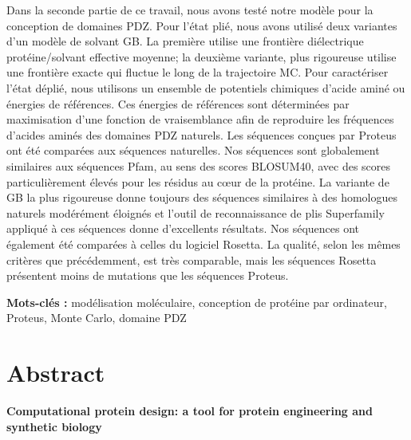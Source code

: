  Dans la seconde partie de ce travail, nous avons testé notre modèle pour la conception de domaines PDZ. Pour l'état plié, nous avons utilisé deux variantes d'un modèle de solvant GB. La première utilise une frontière diélectrique protéine/solvant effective moyenne; la deuxième variante, plus rigoureuse utilise une frontière exacte qui fluctue le long de la trajectoire MC. Pour caractériser l’état déplié, nous utilisons un ensemble de potentiels chimiques d’acide aminé ou énergies de références. Ces énergies de références sont déterminées par maximisation d'une fonction de vraisemblance afin de reproduire les fréquences d'acides aminés des domaines PDZ naturels. Les séquences conçues par Proteus ont été comparées aux séquences naturelles. Nos séquences sont globalement similaires aux séquences Pfam, au sens des scores BLOSUM40, avec des scores particulièrement élevés pour les résidus au cœur de la protéine. La variante de GB la plus rigoureuse donne toujours des séquences similaires à des homologues naturels modérément éloignés et l’outil de reconnaissance de plis Superfamily appliqué à ces séquences donne d’excellents résultats. Nos séquences ont également été comparées à celles du logiciel Rosetta. La qualité, selon les mêmes critères que précédemment, est très comparable, mais les séquences Rosetta présentent moins de mutations que les séquences Proteus.   

\bigskip

\textbf{Mots-clés :} modélisation moléculaire, conception de protéine par ordinateur, Proteus, Monte Carlo, domaine PDZ

\vfill




\section*{Abstract}

{\large\bf\noindent Computational protein design: a tool for protein engineering and synthetic biology}

